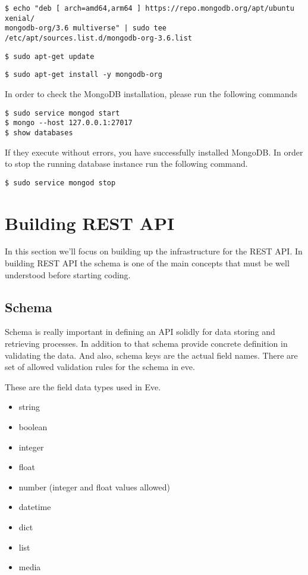 \documentclass{article}
\begin{document}
\begin{verbatim}
$ echo "deb [ arch=amd64,arm64 ] https://repo.mongodb.org/apt/ubuntu xenial/
mongodb-org/3.6 multiverse" | sudo tee /etc/apt/sources.list.d/mongodb-org-3.6.list
\end{verbatim}

\begin{verbatim}
$ sudo apt-get update
\end{verbatim}

\begin{verbatim}
$ sudo apt-get install -y mongodb-org
\end{verbatim}


In order to check the MongoDB installation, please run the following commands

\begin{verbatim}
$ sudo service mongod start
$ mongo --host 127.0.0.1:27017
$ show databases
\end{verbatim}

If they execute without errors, you have successfully installed
MongoDB. In order to stop the running database instance run the
following command.

\begin{verbatim}
$ sudo service mongod stop
\end{verbatim}

\section{Building REST API}

In this section we'll focus on building up the infrastructure for the
REST API. In building REST API the schema is one of the main concepts
that must be well understood before starting coding. 

\subsection{Schema}

Schema is really important in defining an API solidly for data storing
and retrieving processes. In addition to that schema provide concrete
definition in validating the data. And also, schema keys are the
actual field names.  There are set of allowed validation rules for the
schema in eve.

These are the field data types used in Eve. 

\begin{itemize}
\item string
\item boolean
\item integer
\item float
\item number (integer and float values allowed)
\item datetime
\item dict
\item list
\item media
\end{itemize}
\end{document}
